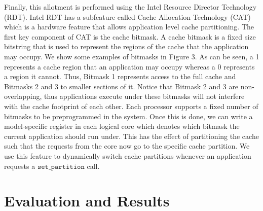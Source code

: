 \documentclass[sigconf,authorversion,noacm]{acmart}
\begin{document}
Finally, this allotment is performed using the Intel Resource Director
Technology (RDT). Intel RDT has a subfeature called Cache Allocation Technology
(CAT) which is a hardware feature that allows application level cache
partitioning. The first key component of CAT is the cache bitmask. A cache
bitmask is a fixed size bitstring that is used to represent the regions of the
cache that the application may occupy. We show some examples of bitmasks in
Figure 3. As can be seen, a 1 represents a cache region that an application may
occupy whereas a 0 represents a region it cannot. Thus, Bitmask 1 represents
access to the full cache and Bitmasks 2 and 3 to smaller sections of it. Notice
that Bitmask 2 and 3 are non-overlapping, thus applications execute under these
bitmasks will not interfere with the cache footprint of each other. Each
processor supports a fixed number of bitmasks to be preprogrammed in the system.
Once this is done, we can write a model-specific register in each logical core
which denotes which bitmask the current application should run under. This has
the effect of partitioning the cache such that the requests from the core now go
to the specific cache partition. We use this feature to dynamically switch cache
partitions whenever an application requests a $\texttt{set\_partition}$ call.

\section{Evaluation and Results}
\end{document}
